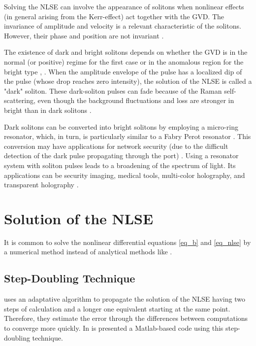     
    Solving the NLSE can involve the appearance of solitons when nonlinear effects (in general arising from the Kerr-effect) act together with the GVD. The invariance of amplitude and velocity is a relevant characteristic of the solitons. However, their phase and position are not invariant \cite{Kodama1994}. 
    
    The existence of dark and bright solitons depends on whether the GVD is in the normal (or positive) regime for the first case or in the anomalous region for the bright type \cite{KIVSHAR199881}, \cite{agr_pap}.  When the amplitude envelope of the pulse has a localized dip of the pulse (whose drop reaches zero intensity), the solution of the NLSE is called a "dark" soliton. These dark-soliton pulses can fade because of the Raman self-scattering, even though the background fluctuations and loss are stronger in bright than in dark solitons \cite{kivshar}. 
    
    Dark solitons can be converted into bright solitons by employing a micro-ring resonator, which, in turn, is particularly similar to a Fabry Perot resonator \cite{yupapin}. This conversion may have applications for network security (due to the difficult detection of the dark pulse propagating through the port) \cite{darkks}. Using a resonator system with soliton pulses leads to a broadening of the spectrum of light. Its applications can be security imaging, medical tools, multi-color holography, and transparent holography \cite{yupapin}.

\section{Solution of the NLSE}

    It is common to solve the nonlinear differential equations \eqref{eq_b} and \eqref{eq_nlse} by a numerical method instead of analytical methods like \citep{Mihalache_1993}.  


    \subsection{Step-Doubling Technique}
         \citep{dudley_taylor_2010} uses an adaptative algorithm to propagate the solution of the NLSE having two steps of calculation and a longer one equivalent starting at the same point. Therefore, they estimate the error through the differences between computations to converge more quickly. In \citep{gitdud}  is presented a Matlab-based code using this step-doubling technique. 
         
